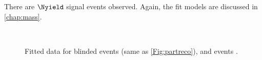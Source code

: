 There are $\Nyield$ \Lbpijpsi signal events observed. Again, the fit models are discussed in \autoref{chap:mass}.



\begin{figure}[!ht]\def\nh{0.3\textwidth}
  \centering
  \\

  \caption{Fitted data for blinded \Lbpi events \protect{} (same as \autoref{Fig:partreco}), and \Lbpijpsi events \protect{}. }
  \label{Fig:optpointfits}
\end{figure}









 
 

